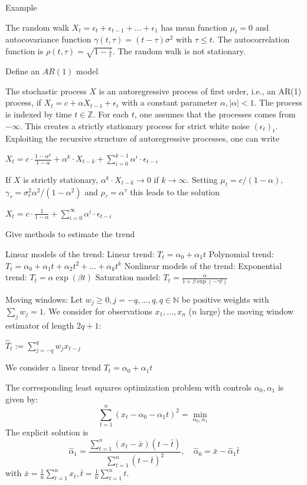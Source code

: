 Example

The random walk \(X_t = \epsilon_t + \epsilon_{t - 1} + \dots + \epsilon_1\) has mean function \(\mu_t = 0\) 
and autocovariance function \(\gamma(t, \tau) = (t - \tau) \sigma^2\) with \(\tau \le t\). 
The autocorrelation function is \(\rho(t, \tau) = \sqrt{1 - \frac{\tau}{t}}\). The random walk is not stationary.


Define an \( AR(1) \) model

The stochastic process \(X\) is an autoregressive process of first order, i.e., an AR(1) process, if
\(X_t = c + \alpha X_{t - 1} + \epsilon_t\)
with a constant parameter \(\alpha, |\alpha| < 1\).
The process is indexed by time \(t \in \mathbb{Z}\). For each \(t\), one assumes that the processes comes from \(-\infty\). This creates a strictly stationary process for strict white noise \((\epsilon_t)_t\).
Exploiting the recursive structure of autoregressive processes, one can write

\(X_t = c \cdot \frac{1 - \alpha^k}{1 - \alpha} + \alpha^k \cdot X_{t - k} + \sum_{i = 0}^{k - 1} \alpha^i \cdot \epsilon_{t - i}\)

If \(X\) is strictly stationary, \(\alpha^k \cdot X_{t - k} \rightarrow 0\) if \(k \rightarrow \infty\). Setting \(\mu_t = c / (1 - \alpha)\), \(\gamma_\tau = \sigma_\epsilon^2 \alpha^2 / (1 - \alpha^2)\) and \(\rho_\tau = \alpha^\tau\) this leads to the solution

\(X_t = c \cdot \frac{1}{1 - \alpha} + \sum_{i = 0}^\infty \alpha^i \cdot \epsilon_{t - i}\)


Give methods to estimate the trend

Linear models of the trend:
Linear trend: \(T_t = \alpha_0 + \alpha_1 t\)
Polynomial trend: \(T_t = \alpha_0 + \alpha_1 t + \alpha_2 t^2 + \dots + \alpha_k t^k\)
Nonlinear models of the trend:
Exponential trend: \(T_t = \alpha \exp(\beta t)\)
Saturation model: \(T_t = \frac{\alpha}{1 + \beta \exp(-\gamma t)}\)

Moving windows:
Let \(w_j \ge 0, j = -q, \dots, q, q \in \mathbb{N}\) be positive weights with \(\sum_j w_j = 1\).
We consider for observations \(x_1, \dots, x_n\) (\(n\) large) the moving window estimator of length \(2q + 1\):

\(\hat{T}_t := \sum_{j = -q}^q w_j x_{t - j}\)


We consider a linear trend
\(T_t = \alpha_0 + \alpha_1 t\)

The corresponding least squares optimization problem with controls \(\alpha_0, \alpha_1\) is given by:
\[\sum_{t = 1}^n (x_t - \alpha_0 - \alpha_1 t)^2 = \min_{\alpha_0, \alpha_1}\]
The explicit solution is
\[\hat{\alpha}_1 = \frac{\sum_{t = 1}^n (x_t - \bar{x})(t - \bar{t})}{\sum_{t = 1}^n (t - \bar{t})^2}, \quad \hat{\alpha}_0 = \bar{x} - \hat{\alpha}_1 \bar{t}\]
with \(\bar{x} = \frac{1}{n} \sum_{t = 1}^n x_t, \bar{t} = \frac{1}{n} \sum_{t = 1}^n t\).

